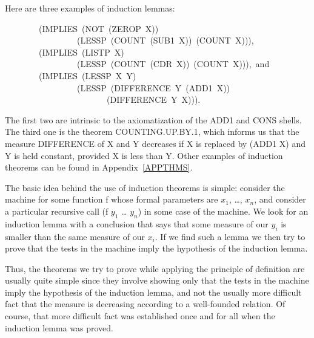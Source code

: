 \documentclass[10pt]{book}
\newenvironment{pubasis}{\begin{flushleft}}{\end{flushleft}}
\begin{document}
Here are three examples of induction lemmas:
\begin{pubasis}
~~~~~~~~(IMPLIES~(NOT~(ZEROP~X))\\
~~~~~~~~~~~~~~~~~(LESSP~(COUNT~(SUB1~X))~(COUNT~X))),\\

~~~~~~~~(IMPLIES~(LISTP~X)\\
~~~~~~~~~~~~~~~~~(LESSP~(COUNT~(CDR~X))~(COUNT~X))),~and\\

~~~~~~~~(IMPLIES~(LESSP~X~Y)\\
~~~~~~~~~~~~~~~~~(LESSP~(DIFFERENCE~Y~(ADD1~X))\\
~~~~~~~~~~~~~~~~~~~~~~~~(DIFFERENCE~Y~X))).\\
\end{pubasis}
The first two are intrinsic to the axiomatization of the ADD1 and
CONS shells.  The third one is the theorem COUNTING.UP.BY.1, which informs us that the
measure DIFFERENCE of X and Y decreases if X is replaced by (ADD1 X) and
Y is held constant, provided X is less than Y.  Other
examples of induction theorems can be found in Appendix~\ref{APPTHMS}.

The basic idea behind the use of induction theorems is simple:
consider the machine for some function f whose formal
parameters are $x_{1}$, \ldots{}, $x_{n}$, and consider a particular recursive
call (f $y_{1}$ \ldots{} $y_{n}$) in some case of the machine.
We look for an induction lemma with
a conclusion that says that some measure of our $y_{i}$ is
smaller than the same measure of our $x_{i}$.  If we find such
a lemma we  then try to prove that the tests in the machine imply the
hypothesis of the induction lemma.

Thus, the theorems we 
try to prove while applying the principle of definition
are usually quite simple since they
involve showing only that the tests in the machine imply the
hypothesis of the induction lemma, and not the usually more difficult fact that
the measure is decreasing according to a well-founded relation.
Of course, that more difficult fact was established once and for all
when the induction lemma was proved.
\end{document}
